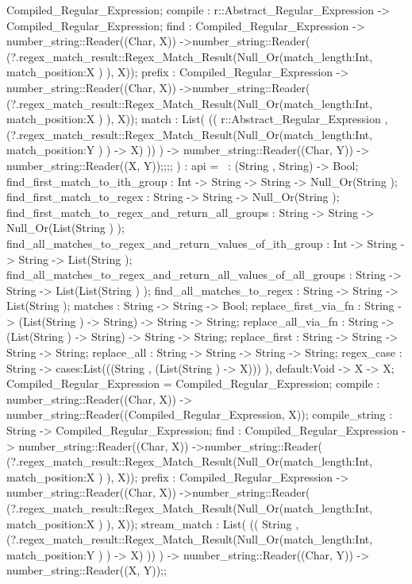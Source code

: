 {{                Compiled_Regular_Expression;
                compile : r::Abstract_Regular_Expression -> Compiled_Regular_Expression;
                    find :
                        Compiled_Regular_Expression
                        ->
                        number_string::Reader((Char, X))
                        ->number_string::Reader(
                          (?.regex_match_result::Regex_Match_Result(Null_Or({match_length:Int, match_position:X} ) ), X));
                    prefix :
                        Compiled_Regular_Expression
                        ->
                        number_string::Reader((Char, X))
                        ->number_string::Reader(
                          (?.regex_match_result::Regex_Match_Result(Null_Or({match_length:Int, match_position:X} ) ), X));
                    match :
                          List(
                          ((    r::Abstract_Regular_Expression ,
                                (?.regex_match_result::Regex_Match_Result(Null_Or({match_length:Int, match_position:Y} ) ) -> X)
                          ))
                           )
                        ->
                        number_string::Reader((Char, Y)) -> number_string::Reader((X, Y));};;};
)
:
api {
    =~ : (String , String) -> Bool;
    find_first_match_to_ith_group : Int -> String -> String -> Null_Or(String );
    find_first_match_to_regex : String -> String -> Null_Or(String );
    find_first_match_to_regex_and_return_all_groups : String -> String -> Null_Or(List(String ) );
    find_all_matches_to_regex_and_return_values_of_ith_group : Int -> String -> String -> List(String );
        find_all_matches_to_regex_and_return_all_values_of_all_groups :
        String -> String -> List(List(String ) );
    find_all_matches_to_regex : String -> String -> List(String );
    matches : String -> String -> Bool;
    replace_first_via_fn : String -> (List(String ) -> String) -> String -> String;
    replace_all_via_fn : String -> (List(String ) -> String) -> String -> String;
    replace_first : String -> String -> String -> String;
    replace_all : String -> String -> String -> String;
    regex_case : String -> {cases:List(((String , (List(String ) -> X))) ), default:Void -> X} -> X;
    Compiled_Regular_Expression  = Compiled_Regular_Expression;
        compile :
        number_string::Reader((Char, X)) -> number_string::Reader((Compiled_Regular_Expression, X));
    compile_string : String -> Compiled_Regular_Expression;
        find :
            Compiled_Regular_Expression
            ->
            number_string::Reader((Char, X))
            ->number_string::Reader(
              (?.regex_match_result::Regex_Match_Result(Null_Or({match_length:Int, match_position:X} ) ), X));
        prefix :
            Compiled_Regular_Expression
            ->
            number_string::Reader((Char, X))
            ->number_string::Reader(
              (?.regex_match_result::Regex_Match_Result(Null_Or({match_length:Int, match_position:X} ) ), X));
        stream_match :
              List(
              ((    String ,
                    (?.regex_match_result::Regex_Match_Result(Null_Or({match_length:Int, match_position:Y} ) ) -> X)
              ))
               )
            ->
            number_string::Reader((Char, Y)) -> number_string::Reader((X, Y));};
